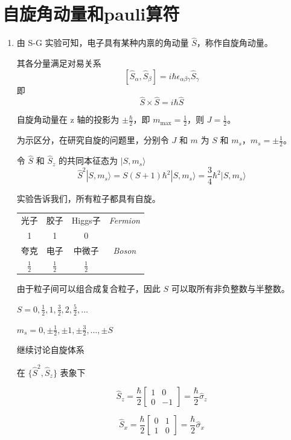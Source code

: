 \documentclass[lang=cn,10pt]{elegantbook}
\begin{document}
\section{自旋角动量和pauli算符}
\begin{enumerate}
	\item 由 S-G 实验可知，电子具有某种内禀的角动量 \(\hat{S}\)，称作自旋角动量。
	
	其各分量满足对易关系
	\[
	[\hat{S}_\alpha, \hat{S}_\beta] = i \hbar \epsilon_{\alpha \beta \gamma} \hat{S}_\gamma
	\]
	即
	\[
	\hat{S} \times \hat{S} = i \hbar \hat{S}
	\]
	
	自旋角动量在 z 轴的投影为 \(\pm \frac{\hbar}{2}\)，即 \(m_{\text{max}} = \frac{1}{2}\)，则 \(J = \frac{1}{2}\)。
	
	为示区分，在研究自旋的问题里，分别令 \(J\) 和 \(m\) 为 \(S\) 和 \(m_s\)，\(m_s = \pm \frac{1}{2}\)。
	
	令 \(\hat{S}\) 和 \(\hat{S}_z\) 的共同本征态为 \(|S, m_s\rangle\)
	\[
	\hat{S}^2 |S, m_s\rangle = S(S+1) \hbar^2 |S, m_s\rangle = \frac{3}{4} \hbar^2 |S, m_s\rangle
	\]
	
	实验告诉我们，所有粒子都具有自旋。
	
	\begin{tabular}{cccc}
		光子 & 胶子 & Higgs子 & \textit{Fermion} \\
		1 & 1 & 0 & \\
		夸克 & 电子 & 中微子 & \textit{Boson} \\
		$\frac{1}{2}$ & $\frac{1}{2}$ & $\frac{1}{2}$ & \\
	\end{tabular}
	
	由于粒子间可以组合成复合粒子，因此 $S$ 可以取所有非负整数与半整数。
	
	$S = 0, \frac{1}{2}, 1, \frac{3}{2}, 2, \frac{5}{2}, \ldots$
	
	$m_s = 0, \pm \frac{1}{2}, \pm 1, \pm \frac{3}{2}, \ldots, \pm S$
	
	继续讨论自旋体系
	
	在 $\{\hat{S}^2, \hat{S}_z\}$ 表象下
	
	\[
	\hat{S}_z = \frac{\hbar}{2} \begin{bmatrix} 1 & 0 \\ 0 & -1 \end{bmatrix} = \frac{\hbar}{2} \hat{\sigma}_z
	\]
	
	\[
	\hat{S}_x = \frac{\hbar}{2} \begin{bmatrix} 0 & 1 \\ 1 & 0 \end{bmatrix} = \frac{\hbar}{2} \hat{\sigma}_x
	\]
	

\end{enumerate}
\end{document}
